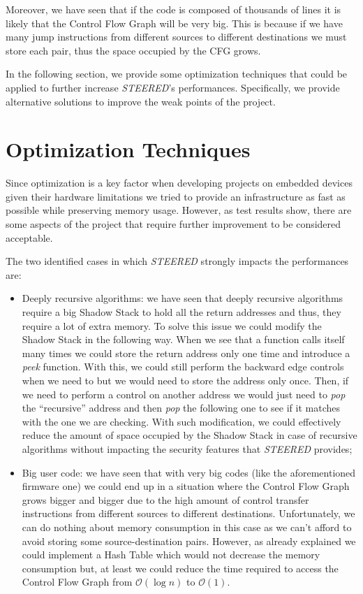 Moreover, we have seen that if the code is composed of thousands of lines it is likely
that the Control Flow Graph will be very big. This is because if we have many
jump instructions from different sources to different destinations we must store
each pair, thus the space occupied by the CFG grows.

In the following section, we provide some optimization techniques that could be
applied to further increase \textit{STEERED}'s performances. Specifically, we provide
alternative solutions to improve the weak points of the project.

\section{Optimization Techniques}
\label{sec:pa_optimization}

Since optimization is a key factor when developing projects on embedded devices
given their hardware limitations we tried to provide an infrastructure as fast
as possible while preserving memory usage. However, as test results show, there are
some aspects of the project that require further improvement to be considered acceptable.

The two identified cases in which \textit{STEERED} strongly impacts the
performances are:
\begin{itemize}
  \item Deeply recursive algorithms: we have seen that deeply recursive
    algorithms require a big Shadow Stack to hold all the return addresses and
    thus, they require a lot of extra memory. To solve this issue we could
    modify the Shadow Stack in the following way. When we see that a function calls
    itself many times we could store the return address only one time and introduce
    a \textit{peek} function. With this, we could still perform the backward
    edge controls when we need to but we would need to store the address only
    once. Then, if we need to perform a control on another address we would just
    need to \textit{pop} the ``recursive'' address and then \textit{pop} the
    following one to see if it matches with the one we are checking. With such modification,
    we could effectively reduce the amount of space occupied by the Shadow Stack
    in case of recursive algorithms without impacting the security features that
    \textit{STEERED} provides;

  \item Big user code: we have seen that with very big codes (like the aforementioned
    firmware one) we could end up in a situation where the Control Flow Graph
    grows bigger and bigger due to the high amount of control transfer
    instructions from different sources to different destinations. Unfortunately,
    we can do nothing about memory consumption in this case as we can't afford
    to avoid storing some source-destination pairs. However, as already
    explained we could implement a Hash Table which would not decrease the
    memory consumption but, at least we could reduce the time required to access
    the Control Flow Graph from $\mathcal{O}(\log{n})$ to $\mathcal{O}(1)$.
\end{itemize}

